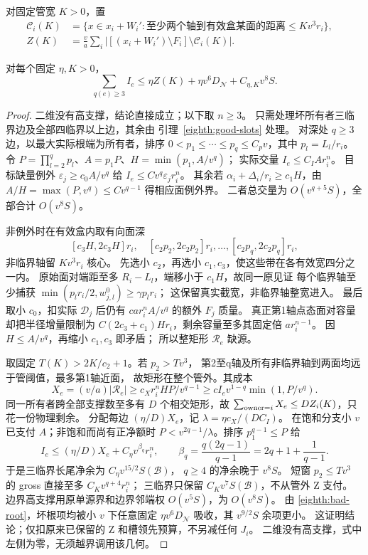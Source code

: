 对固定管宽 \(K>0\)，置
\[
 \begin{aligned}
 \mathcal C_i(K)&=\{x\in x_i+W_i':
 \text{至少两个轴到有效盒某面的距离}\le Kv^3r_i\},\quad\\
 Z(K)&=\frac va\sum_i|[(x_i+W_i')\setminus F_i]\setminus\mathcal C_i(K)|.
 \end{aligned}
\]
\begin{lemma}[一般支撑数的实际净价格]\label{eighth:high-net}
对每个固定 \(\eta,K>0\)，
\begin{equation}\label{eighth:high-payment}
 \sum_{q(e)\ge3}I_e\le
 \eta Z(K)+\eta v^6D_{\mathcal N}+C_{\eta,K}v^8S .
\end{equation}
\end{lemma}
\begin{proof}
二维没有高支撑，结论直接成立；以下取 \(n\ge3\)。
只需处理坏所有者三临界边及全部四临界以上边，其余由
引理~\ref{eighth:good-slots} 处理。
对深处 \(q\ge3\) 边，以最大实际根端为所有者，排序
\(0<p_1\le\cdots\le p_q\le C_pv\)，其中 \(p_l=L_l/r_i\)。
令 \(P=\prod_{l=2}^q p_l\)、\(A=p_1P\)、\(H=\min(p_1,A/v^q)\)；
实际交量 \(I_e\le C_IAr_i^n\)。
目标缺量例外 \(\varepsilon_j\ge c_0A/v^q\) 给
\(I_e\le Cv^q\varepsilon_jr_i^n\)。
其余若 \(\alpha_i+\Delta_i/r_i\ge c_1H\)，由
\(A/H=\max(P,v^q)\le Cv^{q-1}\) 得相应面例外界。
二者总交量为 \(O(v^{q+5}S)\)，全部合计 \(O(v^8S)\)。

非例外时在有效盒内取有向面深
\[
 [c_3H,2c_3H]r_i,\quad
 [c_2p_2,2c_2p_2]r_i,\ldots,[c_2p_q,2c_2p_q]r_i,
\]
非临界轴留 \(Kv^3r_i\) 核心。
先选小 \(c_2\)，再选小 \(c_1,c_3\)，使这些带在各有效宽四分之一内。
原始面对端距至多 \(R_i-L_l\)，端移小于 \(c_1H\)，故同一原见证
每个临界轴至少捕获 \(\min(p_lr_i/2,w^0_{j,l})\ge\gamma p_lr_i\)；
这保留真实截宽，非临界轴整宽进入。
最后取小 \(c_0\)，扣实际 \(\mathscr D_j\) 后仍有
\(car_i^nA/v^q\) 的额外 \(F_j\) 质量。
真正第1轴点态面对容量却把半径增量限制为
\(C(2c_3+c_1)Hr_i\)，剩余容量至多其固定倍 \(ar_i^{n-1}\)。
因 \(H\le A/v^q\)，再缩小 \(c_1,c_3\) 即矛盾；
所以整矩形 \(\mathcal R_e\) 缺源。

取固定 \(T(K)>2K/c_2+1\)。若 \(p_2>Tv^3\)，
第2至q轴及所有非临界轴到两面均远于管阈值，最多第1轴近面，
故矩形在整个管外。其成本
\[
 X_e=(v/a)|\mathcal R_e|
 \ge c_Xr_i^nHP/v^{q-1}
 \ge cI_ev^{1-q}\min(1,P/v^q).
\]
同一所有者跨全部支撑数至多有 \(D\) 个相交矩形，故
\(\sum_{{\rm owner}=i}X_e\le DZ_i(K)\)，只花一份物理剩余。
分配每边 \((\eta/D)X_e\)，记 \(\lambda=\eta c_X/(DC_I)\)。
在饱和分支小 \(v\) 已支付 \(A\)；非饱和而尚有正净额时
\(P<v^{2q-1}/\lambda\)。排序 \(p_1^{q-1}\le P\) 给
\[
 I_e\le(\eta/D)X_e+C_\eta v^{\beta_q}r_i^n,\qquad
 \beta_q=\frac{q(2q-1)}{q-1}=2q+1+\frac1{q-1}.
\]
于是三临界长尾净余为 \(C_\eta v^{15/2}S(\mathcal B)\)，
\(q\ge4\) 的净余晚于 \(v^8S\)。
短窗 \(p_2\le Tv^3\) 的 gross 直接至多 \(C_Kv^{q+4}r_i^n\)；
三临界只保留 \(C_Kv^7S(\mathcal B)\)，不从管外 Z 支付。
边界高支撑用原单源界和边界邻端权 \(O(v^5S)\)，为 \(O(v^8S)\)。
由 \eqref{eighth:bad-root}，坏根项均被小 \(v\) 下任意固定
\(\eta v^6D_{\mathcal N}\) 吸收，其 \(v^{9/2}S\) 余项更小。
这证明结论；仅扣原来已保留的 Z 和槽领先预算，不另减任何 \(J_i\)。
二维没有高支撑，式中左侧为零，无须越界调用该几何。
\end{proof}

